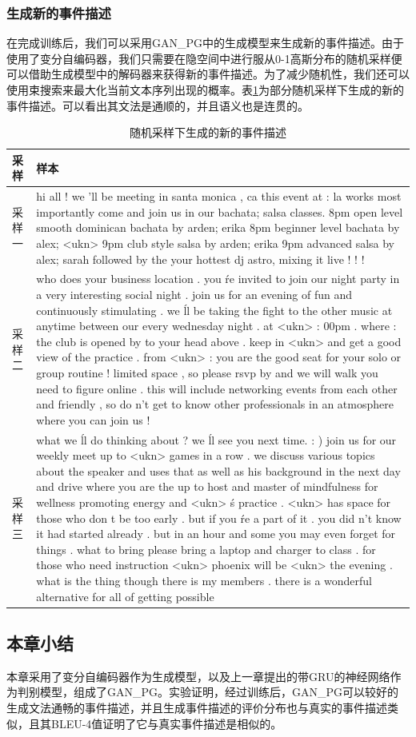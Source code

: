 \subsubsection{生成新的事件描述}
在完成训练后，我们可以采用GAN\_PG中的生成模型来生成新的事件描述。由于使用了变分自编码器，我们只需要在隐空间中进行服从0-1高斯分布的随机采样便可以借助生成模型中的解码器来获得新的事件描述。为了减少随机性，我们还可以使用束搜索来最大化当前文本序列出现的概率。表\ref{t3-4}为部分随机采样下生成的新的事件描述。可以看出其文法是通顺的，并且语义也是连贯的。
\begin{table}[htb]
    \centering
    \caption{\label{t3-4}随机采样下生成的新的事件描述}
    \begin{tabular*}{\linewidth}{p{.1\linewidth}p{.85\linewidth}}
\toprule
采样&样本\\
\midrule
采样一&hi all ! we 'll be meeting in santa monica , ca this event at : la works most importantly come and join us in our bachata; salsa classes. 8pm open level smooth dominican bachata by arden; erika 8pm beginner level bachata by alex; <ukn> 9pm club style salsa by arden; erika 9pm advanced salsa by alex; sarah followed by the your hottest dj astro, mixing it live ! ! ! \\
采样二 & who does your business location . you \'re invited to join our night party in a very interesting social night . join us for an evening of fun and continuously stimulating . we \'ll be taking the fight to the other music at anytime between our every wednesday night . at <ukn> : 00pm . where : the club is opened by to your head above . keep in <ukn> and get a good view of the practice . from <ukn> : you are the good seat for your solo or group routine ! limited space , so please rsvp by and we will walk you need to figure online . this will include networking events from each other and friendly , so do n't get to know other professionals in an atmosphere where you can join us ! \\
采样三& what we \'ll do thinking about ? we \'ll see you next time. : ) join us for our weekly meet up to <ukn> games in a row . we discuss various topics about the speaker and uses that as well as his background in the next day and drive where you are the up to host and master of mindfulness for wellness promoting energy and <ukn> \'s practice . <ukn> has space for those who don t be too early . but if you \'re a part of it . you did n't know it had started already . but in an hour and some you may even forget for things . what to bring please bring a laptop and charger to class . for those who need instruction <ukn> phoenix will be <ukn> the evening . what is the thing though there is my members . there is a wonderful alternative for all of getting possible  \\
\bottomrule 
    \end{tabular*}
\end{table}
\subsection{本章小结}
本章采用了变分自编码器作为生成模型，以及上一章提出的带GRU的神经网络作为判别模型，组成了GAN\_PG。实验证明，经过训练后，GAN\_PG可以较好的生成文法通畅的事件描述，并且生成事件描述的评价分布也与真实的事件描述类似，且其BLEU-4值证明了它与真实事件描述是相似的。
%  
